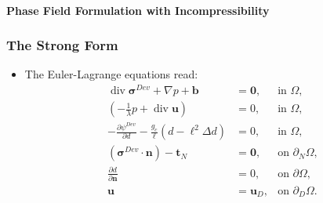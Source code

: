\documentclass{beamer}
\newcommand{\SectionThree}{Phase Field Formulation with Incompressibility}
\DeclareMathOperator{\divergence}{div}
\begin{document}
\begin{frame}
	\framesubtitle{\SectionThree}
	\frametitle{The Strong Form}
	\begin{itemize}
		\setlength\itemsep{2em}

		
		\item The Euler-Lagrange equations read:
		\begin{subequations}
			\begin{align*}
			\divergence \bm{\sigma}^{Dev} + \nabla p + \mathbf{b} &= \mathbf{0}, &\text{in~}\Omega,\\
			\left({-}\frac{1}{\lambda}p+\divergence\bm{u}\right) &= 0,&\text{in~}\Omega,\\
			{-}\frac{\partial{\psi}^{Dev}}{\partial d} - \frac{g_c}{\ell}\left(d - {\ell}^2\Delta d\right) &= 0,  &\text{in~} \Omega, \\
			\left(\bm{\sigma}^{Dev}\cdot\bm{n}\right) - \bm{t}_N &= \bm{0}, &\text{on~} \partial_N\Omega,\\	
			\frac{\partial d}{\partial \bm{n}} &= 0, &\text{on~} \partial\Omega,\\
			\bm{u} &= \bm{u}_D, &\text{on~} \partial_D\Omega.
			\end{align*}
		\end{subequations}
	\end{itemize}
\end{frame}
\end{document}

